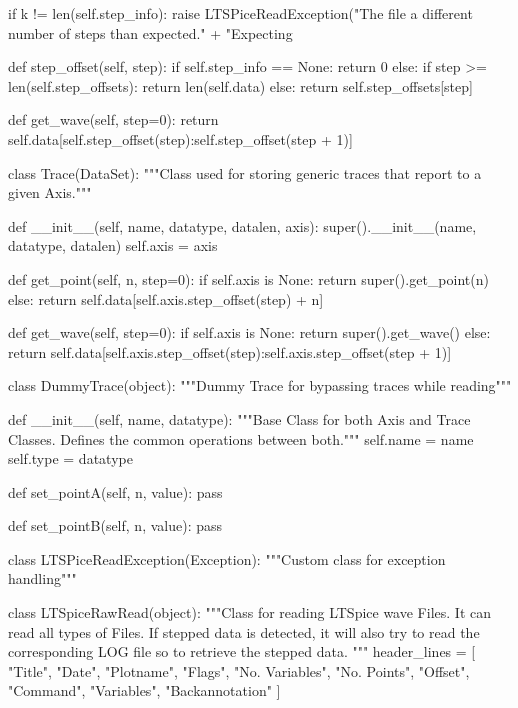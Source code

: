         if k != len(self.step_info):
            raise LTSPiceReadException("The file a different number of steps than expected.\n" +
                                       "Expecting %

    def step_offset(self, step):
        if self.step_info == None:
            return 0
        else:
            if step >= len(self.step_offsets):
                return len(self.data)
            else:
                return self.step_offsets[step]

    def get_wave(self, step=0):
        return self.data[self.step_offset(step):self.step_offset(step + 1)]


class Trace(DataSet):
    """Class used for storing generic traces that report to a given Axis."""

    def __init__(self, name, datatype, datalen, axis):
        super().__init__(name, datatype, datalen)
        self.axis = axis

    def get_point(self, n, step=0):
        if self.axis is None:
            return super().get_point(n)
        else:
            return self.data[self.axis.step_offset(step) + n]

    def get_wave(self, step=0):
        if self.axis is None:
            return super().get_wave()
        else:
            return self.data[self.axis.step_offset(step):self.axis.step_offset(step + 1)]


class DummyTrace(object):
    """Dummy Trace for bypassing traces while reading"""

    def __init__(self, name, datatype):
        """Base Class for both Axis and Trace Classes.
        Defines the common operations between both."""
        self.name = name
        self.type = datatype

    def set_pointA(self, n, value):
        pass

    def set_pointB(self, n, value):
        pass


class LTSPiceReadException(Exception):
    """Custom class for exception handling"""


class LTSpiceRawRead(object):
    """Class for reading LTSpice wave Files. It can read all types of Files. If stepped data is detected,
    it will also try to read the corresponding LOG file so to retrieve the stepped data.
    """
    header_lines = [
        "Title",
        "Date",
        "Plotname",
        "Flags",
        "No. Variables",
        "No. Points",
        "Offset",
        "Command",
        "Variables",
        "Backannotation"
    ]


